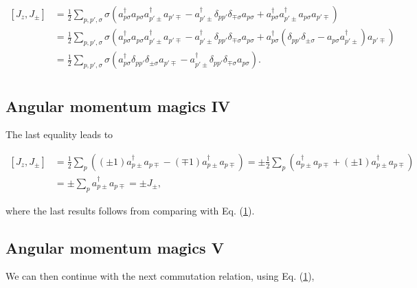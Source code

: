 \documentclass[11pt]{article}
\begin{document}
    \[
\begin{align*}
[J_z,J_\pm]
&= \frac{1}{2} \sum_{p,p',\sigma} \sigma \left(
a_{p\sigma}^\dagger a_{p\sigma} a_{p'\pm}^\dagger a_{p'\mp} -
a_{p'\pm}^\dagger \delta_{pp'} \delta_{\mp \sigma} a_{p\sigma} +
a_{p\sigma}^\dagger a_{p'\pm}^\dagger a_{p\sigma} a_{p'\mp} \right) \\
&= \frac{1}{2} \sum_{p,p',\sigma} \sigma \left(
a_{p\sigma}^\dagger a_{p\sigma} a_{p'\pm}^\dagger a_{p'\mp} -
a_{p'\pm}^\dagger \delta_{pp'} \delta_{\mp \sigma} a_{p\sigma} +
a_{p\sigma}^\dagger \left( \delta_{pp'} \delta_{\pm \sigma} - a_{p\sigma} a_{p'\pm}^\dagger \right) a_{p'\mp} \right) \\
&= \frac{1}{2} \sum_{p,p',\sigma} \sigma \left(
a_{p\sigma}^\dagger \delta_{pp'} \delta_{\pm \sigma} a_{p'\mp} -
a_{p'\pm}^\dagger \delta_{pp'} \delta_{\mp \sigma} a_{p\sigma} \right). \\
\end{align*}
\]

    \hypertarget{angular-momentum-magics-iv}{%
\subsection{Angular momentum magics
IV}\label{angular-momentum-magics-iv}}

The last equality leads to

    \[
\begin{align*}
[J_z,J_\pm] &= \frac{1}{2} \sum_p \left(
(\pm 1) a_{p\pm}^\dagger a_{p\mp} - (\mp 1)
a_{p\pm}^\dagger a_{p\mp} \right) =
\pm \frac{1}{2} \sum_p \left(
a_{p\pm}^\dagger a_{p\mp} + (\pm 1)
a_{p\pm}^\dagger a_{p\mp} \right) \\
&= \pm \sum_p a_{p\pm}^\dagger a_{p\mp} = \pm J_\pm,
\end{align*}
\]

    where the last results follows from comparing with Eq.
(\hyperref[eqjpm]{1}).

    \hypertarget{angular-momentum-magics-v}{%
\subsection{Angular momentum magics V}\label{angular-momentum-magics-v}}

We can then continue with the next commutation relation, using Eq.
(\hyperref[eqjpm]{1}),
\end{document}
